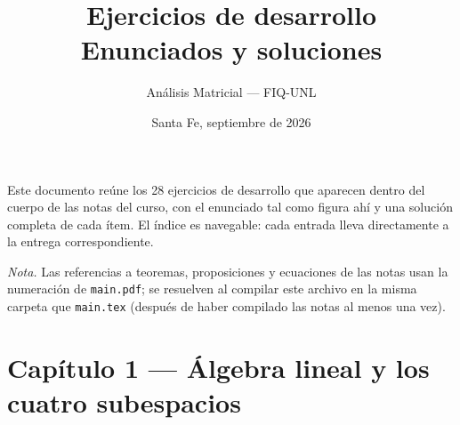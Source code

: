 \documentclass[11pt,a4paper]{article}
\title{\bfseries Ejercicios de desarrollo\\[4pt]\large Enunciados y soluciones}
\author{Análisis Matricial --- FIQ-UNL}
\date{Santa Fe, septiembre de 2026}
\newcounter{entrega}[section]
\begin{document}
\maketitle

\noindent
Este documento reúne los 28 ejercicios de desarrollo que aparecen dentro del
cuerpo de las notas del curso, con el enunciado tal como figura ahí y una
solución completa de cada ítem. El índice es navegable: cada entrada lleva
directamente a la entrega correspondiente.

\medskip
\noindent\emph{Nota.} Las referencias a teoremas, proposiciones y ecuaciones de
las notas usan la numeración de \texttt{main.pdf}; se resuelven al compilar este
archivo en la misma carpeta que \texttt{main.tex} (después de haber compilado las
notas al menos una vez).

\tableofcontents
\bigskip

\clearpage
\section{Capítulo 1 --- Álgebra lineal y los cuatro subespacios}
\setcounter{entrega}{0}
\end{document}
